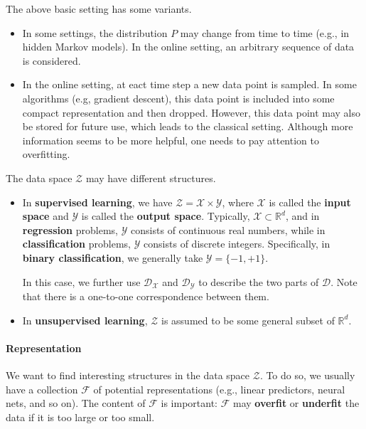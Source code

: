 \documentclass[openany]{book}
\theoremstyle{definition}
\theoremstyle{remark}
\begin{document}
The above basic setting has some variants.
\begin{itemize}
    \item In some settings, the distribution $P$ may change from time to time (e.g., in hidden Markov models). In the online setting, an arbitrary sequence of data is considered.

    \item In the online setting, at eact time step a new data point is sampled. In some algorithms (e.g, gradient descent), this data point is included into some compact representation and then dropped. However, this data point may also be stored for future use, which leads to the classical setting. Although more information seems to be more helpful, one needs to pay attention to overfitting.
\end{itemize}

The data space $\mathcal{Z}$ may have different structures.
\begin{itemize}
    \item In \textbf{supervised learning}, we have $\mathcal{Z}=\mathcal{X}\times \mathcal{Y}$, where $\mathcal{X}$ is called the \textbf{input space} and $\mathcal{Y}$ is called the \textbf{output space}. Typically, $\mathcal{X}\subset \mathbb{R}^d$, and in \textbf{regression} problems, $\mathcal{Y}$ consists of continuous real numbers, while in \textbf{classification} problems, $\mathcal{Y}$ consists of discrete integers. Specifically, in \textbf{binary classification}, we generally take $\mathcal{Y}=\{-1,+1\}$.

    In this case, we further use $\mathcal{D}_{\mathcal{X}}$ and $\mathcal{D}_{\mathcal{Y}}$ to describe the two parts of $\mathcal{D}$. Note that there is a one-to-one correspondence between them.

    \item In \textbf{unsupervised learning}, $\mathcal{Z}$ is assumed to be some general subset of $\mathbb{R}^d$.
\end{itemize}

\paragraph{Representation}
We want to find interesting structures in the data space $\mathcal{Z}$. To do so, we usually have a collection $\mathcal{F}$ of potential representations (e.g., linear predictors, neural nets, and so on). The content of $\mathcal{F}$ is important: $\mathcal{F}$ may \textbf{overfit} or \textbf{underfit} the data if it is too large or too small.
\end{document}
